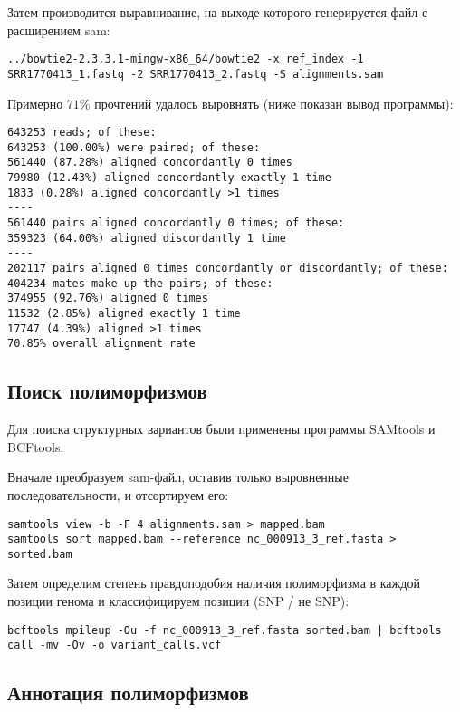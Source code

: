 \documentclass[a4paper,12pt]{article}
\begin{document}
Затем производится выравнивание, на выходе которого генерируется файл с расширением sam:

\begin{lstlisting}
../bowtie2-2.3.3.1-mingw-x86_64/bowtie2 -x ref_index -1 SRR1770413_1.fastq -2 SRR1770413_2.fastq -S alignments.sam
\end{lstlisting}

Примерно $71\%$ прочтений удалось выровнять (ниже показан вывод программы):

\begin{verbatim}
643253 reads; of these:
643253 (100.00%) were paired; of these:
561440 (87.28%) aligned concordantly 0 times
79980 (12.43%) aligned concordantly exactly 1 time
1833 (0.28%) aligned concordantly >1 times
----
561440 pairs aligned concordantly 0 times; of these:
359323 (64.00%) aligned discordantly 1 time
----
202117 pairs aligned 0 times concordantly or discordantly; of these:
404234 mates make up the pairs; of these:
374955 (92.76%) aligned 0 times
11532 (2.85%) aligned exactly 1 time
17747 (4.39%) aligned >1 times
70.85% overall alignment rate
\end{verbatim}

\subsection{Поиск полиморфизмов}

Для поиска структурных вариантов были применены программы SAMtools и BCFtools.

Вначале преобразуем sam-файл, оставив только выровненные последовательности, и отсортируем его:

\begin{lstlisting}
samtools view -b -F 4 alignments.sam > mapped.bam
samtools sort mapped.bam --reference nc_000913_3_ref.fasta > sorted.bam
\end{lstlisting}

Затем определим степень правдоподобия наличия полиморфизма в каждой позиции генома и классифицируем позиции (SNP / не SNP):

\begin{lstlisting}
bcftools mpileup -Ou -f nc_000913_3_ref.fasta sorted.bam | bcftools call -mv -Ov -o variant_calls.vcf
\end{lstlisting}

\subsection{Аннотация полиморфизмов}
\end{document}
